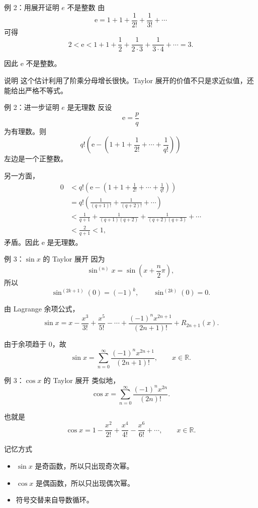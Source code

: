 \documentclass[aspectratio=169,11pt]{ctexbeamer}
\newcommand{\R}{\mathbb{R}}
\newcommand{\ee}{\mathrm{e}}
\begin{document}
\begin{frame}{例 2：用展开证明 $e$ 不是整数}
\small
由
\[
  \ee=1+1+\frac1{2!}+\frac1{3!}+\cdots
\]
可得
\[
  2<\ee<1+1+\frac12+\frac1{2\cdot3}+\frac1{3\cdot4}+\cdots=3.
\]

因此 $\ee$ 不是整数。

\begin{block}{说明}
这个估计利用了阶乘分母增长很快。Taylor 展开的价值不只是求近似值，还能给出严格不等式。
\end{block}
\end{frame}

\begin{frame}{例 2：进一步证明 $e$ 是无理数}
\footnotesize
反设
\[
  \ee=\frac pq
\]
为有理数。则
\[
  q!\left(\ee-\left(1+1+\frac1{2!}+\cdots+\frac1{q!}\right)\right)
\]
左边是一个正整数。

另一方面，
\[
\begin{aligned}
0
&<q!\left(\ee-\left(1+1+\frac1{2!}+\cdots+\frac1{q!}\right)\right)\\
&=q!\left(\frac1{(q+1)!}+\frac1{(q+2)!}+\cdots\right)\\
&<\frac1{q+1}+\frac1{(q+1)(q+2)}
  +\frac1{(q+2)(q+3)}+\cdots\\
&<\frac2{q+1}<1,
\end{aligned}
\]
矛盾。因此 $\ee$ 是无理数。
\end{frame}

\begin{frame}{例 3：$\sin x$ 的 Taylor 展开}
\small
因为
\[
  \sin^{(n)}x=\sin\left(x+\frac n2\pi\right),
\]
所以
\[
  \sin^{(2k+1)}(0)=(-1)^k,\qquad \sin^{(2k)}(0)=0.
\]

由 Lagrange 余项公式，
\[
  \sin x
  =
  x-\frac{x^3}{3!}+\frac{x^5}{5!}
  -\cdots+\frac{(-1)^n x^{2n+1}}{(2n+1)!}
  +R_{2n+1}(x).
\]

由于余项趋于 $0$，故
\[
  \sin x=\sum_{n=0}^{\infty}\frac{(-1)^n x^{2n+1}}{(2n+1)!},
  \qquad x\in\R.
\]
\end{frame}

\begin{frame}{例 3：$\cos x$ 的 Taylor 展开}
\small
类似地，
\[
  \cos x
  =
  \sum_{n=0}^{\infty}
  \frac{(-1)^n x^{2n}}{(2n)!}.
\]

也就是
\[
  \cos x
  =
  1-\frac{x^2}{2!}+\frac{x^4}{4!}
  -\frac{x^6}{6!}+\cdots,\qquad x\in\R.
\]

\begin{block}{记忆方式}
\begin{itemize}
  \item $\sin x$ 是奇函数，所以只出现奇次幂。
  \item $\cos x$ 是偶函数，所以只出现偶次幂。
  \item 符号交替来自导数循环。
\end{itemize}
\end{block}
\end{frame}
\end{document}
